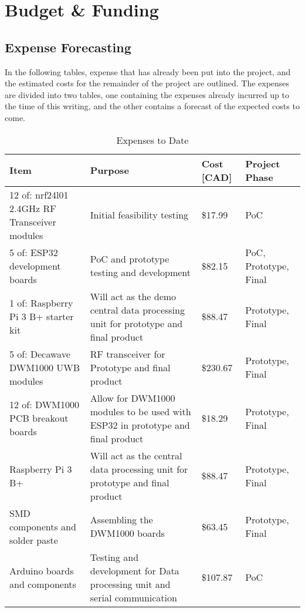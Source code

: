 \setcounter{section}{3}
\section{Budget \& Funding}
\bigskip

\subsection{Expense Forecasting}
\medskip
In the following tables, expense that has already been put into the project, and the estimated costs for the remainder of the project are outlined.  The expenses are divided into two tables, one containing the expenses already incurred up to the time of this writing, and the other contains a forecast of the expected costs to come.

\begin{table}[H]
\centering
\begin{tabular}{ | m{4.75cm} | m{5cm} | m{2.5cm} | m{3cm} |}
\hline
\textbf{Item} & \textbf{Purpose} & \textbf{Cost [CAD]} & \textbf{Project Phase}  \\
\hline
12 of: nrf24l01 2.4GHz RF Transceiver modules & Initial feasibility testing & \$17.99 & PoC \\
\hline
5 of: ESP32 development boards & PoC and prototype testing and development & \$82.15 & PoC, Prototype, Final \\
\hline
1 of: Raspberry Pi 3 B+ starter kit & Will act as the demo central data processing unit for prototype and final product & \$88.47 & Prototype, Final \\
\hline
5 of: Decawave DWM1000 UWB modules & RF transceiver for Prototype and final product & \$230.67 & Prototype, Final \\
\hline
12 of: DWM1000 PCB breakout boards & Allow for DWM1000 modules to be used with ESP32 in prototype and final product & \$18.29 & Prototype, Final \\
\hline
Raspberry Pi 3 B+ & Will act as the central data processing unit for prototype and final product & \$88.47 & Prototype, Final \\
\hline
SMD components and solder paste & Assembling the DWM1000 boards & \$63.45 & Prototype, Final\\
\hline
Arduino boards and components & Testing and development for Data processing unit and serial communication & \$107.87 & PoC \\
\hline
\end{tabular}
\caption{Expenses to Date}
\end{table}

